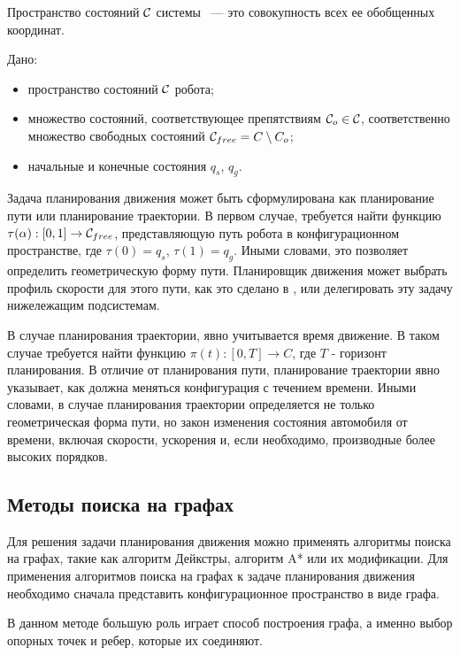 Пространство состояний $\mathcal{C}$ системы ~--- это совокупность всех ее обобщенных координат.

Дано:
\begin{itemize}
    \item пространство состояний $\mathcal{C}$ робота;
    \item множество состояний, соответствующее препятствиям $\mathcal{C}_o \in \mathcal{C}$, соответственно
          множество свободных состояний $\mathcal{C}_{free} = C \setminus C_o$;
    \item начальные и конечные состояния $q_s$, $q_g$.
\end{itemize}

Задача планирования движения может быть сформулирована как планирование пути или планирование траектории.
В первом случае, требуется найти функцию $\tau(\alpha): [0,1] \rightarrow \mathcal{C}_{free}$, представляющую путь робота в
конфигурационном пространстве, где $\tau(0)=q_s$, $\tau(1)=q_g$. Иными словами, это позволяет определить
геометрическую форму пути. Планировщик движения может выбрать профиль скорости для этого пути,
как это сделано в \cite{darpa_boss}, или делегировать эту задачу нижележащим подсистемам.

В случае планирования траектории, явно учитывается время движение. В таком случае требуется найти функцию
$\pi(t) : [0, T] \rightarrow C$, где $T$ - горизонт планирования. В отличие от планирования пути, планирование
траектории явно указывает, как должна меняться конфигурация с течением времени. Иными словами,
в случае планирования траектории определяется не только геометрическая форма пути, но закон
изменения состояния автомобиля от времени, включая скорости, ускорения и, если необходимо,
производные более высоких порядков.

\subsection{Методы поиска на графах}
Для решения задачи планирования движения можно применять алгоритмы поиска на графах, такие как
алгоритм Дейкстры, алгоритм A* или их модификации. Для применения алгоритмов поиска на графах к задаче
планирования движения необходимо сначала представить конфигурационное пространство в виде графа.

В данном методе большую роль играет способ построения графа, а именно выбор опорных точек и ребер,
которые их соединяют.


